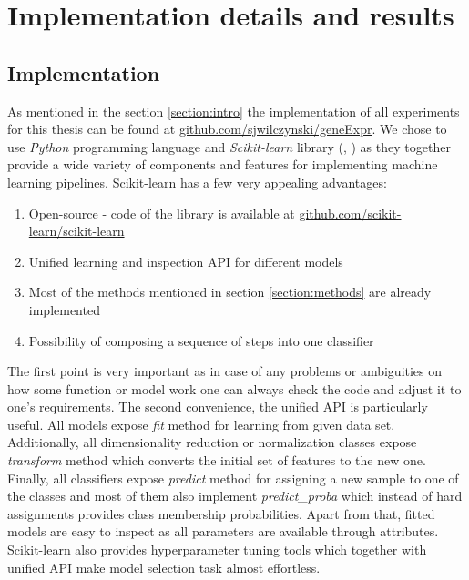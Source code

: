 \documentclass[shortabstract, english, mgr]{iithesis}
\begin{document}
\chapter{Implementation details and results} \label{section:results}

\section{Implementation}

As mentioned in the section \ref{section:intro} the implementation of all experiments for this thesis can be found at \url{github.com/sjwilczynski/geneExpr}. We chose to use \textit{Python} programming language and \textit{Scikit-learn} library (\cite{sklearn1}, \cite{sklearn2}) as they together provide a wide variety of components and features for implementing machine learning pipelines. Scikit-learn has a few very appealing advantages:
\begin{enumerate}
    \item Open-source - code of the library is available at \url{github.com/scikit-learn/scikit-learn}
    \item Unified learning and inspection API for different models
    \item Most of the methods mentioned in section \ref{section:methods} are already implemented
    \item  Possibility of composing a sequence of steps into one classifier 
\end{enumerate}
The first point is very important as in case of any problems or ambiguities on how some function or model work one can always check the code and adjust it to one's requirements. The second convenience, the unified API is particularly useful. All models expose \textit{fit} method for learning from given data set. Additionally, all dimensionality reduction or normalization classes expose \textit{transform} method which converts the initial set of features to the new one. Finally, all classifiers expose \textit{predict} method for assigning a new sample to one of the classes and most of them also implement \textit{predict\_proba} which instead of hard assignments provides class membership probabilities. Apart from that, fitted models are easy to inspect as all parameters are available through attributes. Scikit-learn also provides hyperparameter tuning tools which together with unified API make model selection task almost effortless. 
\end{document}

